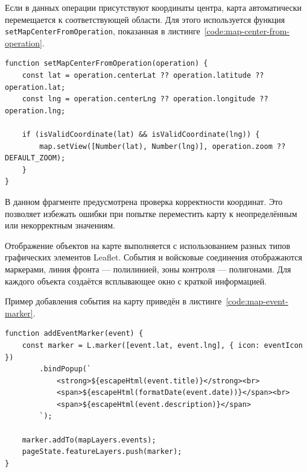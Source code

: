 Если в данных операции присутствуют координаты центра, карта автоматически перемещается к соответствующей области. Для этого используется функция \texttt{setMapCenterFromOperation}, показанная в листинге~\ref{code:map-center-from-operation}.

\begin{code}
\label{code:map-center-from-operation}
\vspace{-0.75cm}
\begin{verbatim}
function setMapCenterFromOperation(operation) {
    const lat = operation.centerLat ?? operation.latitude ?? operation.lat;
    const lng = operation.centerLng ?? operation.longitude ?? operation.lng;

    if (isValidCoordinate(lat) && isValidCoordinate(lng)) {
        map.setView([Number(lat), Number(lng)], operation.zoom ?? DEFAULT_ZOOM);
    }
}
\end{verbatim}
\end{code}

В данном фрагменте предусмотрена проверка корректности координат. Это позволяет избежать ошибки при попытке переместить карту к неопределённым или некорректным значениям.

Отображение объектов на карте выполняется с использованием разных типов графических элементов Leaflet. События и войсковые соединения отображаются маркерами, линия фронта --- полилинией, зоны контроля --- полигонами. Для каждого объекта создаётся всплывающее окно с краткой информацией.

Пример добавления события на карту приведён в листинге~\ref{code:map-event-marker}.

\begin{code}
\label{code:map-event-marker}
\vspace{-0.75cm}
\begin{verbatim}
function addEventMarker(event) {
    const marker = L.marker([event.lat, event.lng], { icon: eventIcon })
        .bindPopup(`
            <strong>${escapeHtml(event.title)}</strong><br>
            <span>${escapeHtml(formatDate(event.date))}</span><br>
            <span>${escapeHtml(event.description)}</span>
        `);

    marker.addTo(mapLayers.events);
    pageState.featureLayers.push(marker);
}
\end{verbatim}
\end{code}

